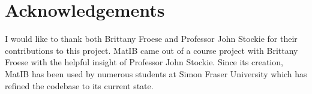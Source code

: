 \documentclass{article}
\begin{document}
\section{Acknowledgements}\label{sec:acknowledgements}

I would like to thank both Brittany Froese and Professor John Stockie for their contributions to this project. 
MatIB came out of a course project with Brittany Froese with the helpful insight of Professor John Stockie. 
Since its creation, MatIB has been used by numerous students at Simon Fraser University 
which has refined the codebase to its current state.

\newpage



\end{document}

